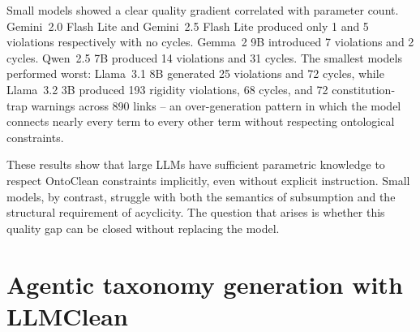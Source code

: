 \documentclass{IOS-Book-Article}
\begin{document}
Small models showed a clear quality gradient correlated with parameter
count.  Gemini~2.0 Flash Lite and Gemini~2.5 Flash Lite produced only
1 and 5 violations respectively with no cycles.  Gemma~2 9B introduced
7 violations and 2 cycles.  Qwen~2.5 7B produced 14 violations and 31
cycles.  The smallest models performed worst: Llama~3.1 8B generated
25 violations and 72 cycles, while Llama~3.2 3B produced 193 rigidity
violations, 68 cycles, and 72 constitution-trap warnings across 890
links -- an over-generation pattern in which the model connects nearly
every term to every other term without respecting ontological
constraints.

These results show that large LLMs have sufficient parametric
knowledge to respect OntoClean constraints implicitly, even without
explicit instruction.  Small models, by contrast, struggle with both
the semantics of subsumption and the structural requirement of
acyclicity.  The question that arises is whether this quality gap can be
closed without replacing the model.

\section{Agentic taxonomy generation with LLMClean}
\label{sec:agentic}
\end{document}

